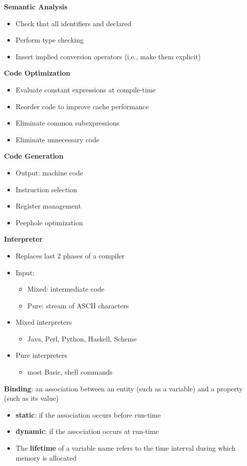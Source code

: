 \documentclass[11pt]{article} %
\begin{document}
{\bf Semantic Analysis}
\begin{itemize}
\item Check that all identifiers and declared
\item Perform type checking
\item Insert implied conversion operators (i.e., make them explicit)
\end{itemize}

{\bf Code Optimization}
\begin{itemize}
\item Evaluate constant expressions at compile-time
\item Reorder code to improve cache performance
\item Eliminate common subexpressions
\item Eliminate unnecessary code
\end{itemize}

{\bf Code Generation}
\begin{itemize}
\item Output: machine code
\item Instruction selection
\item Register management
\item Peephole optimization
\end{itemize}

\pagebreak

{\bf Interpreter}
\begin{itemize}
\item Replaces last 2 phases of a compiler
\item Input:
\begin{itemize}
\item Mixed: intermediate code
\item Pure: stream of ASCII characters
\end{itemize}
\item Mixed interpreters
\begin{itemize}
\item Java, Perl, Python, Haskell, Scheme
\end{itemize}
\item Pure interpreters
\begin{itemize}
\item most Basic, shell commands
\end{itemize}
\end{itemize}

{\bf Binding}: an association between an entity (such as a variable) and a property (such as its value)
\begin{itemize}
\item {\bf static}: if the association occurs before run-time
\item {\bf dynamic}: if the association occurs at run-time
\item The {\bf lifetime} of a variable name refers to the time interval during which memory is allocated
\end{itemize}
\end{document}

